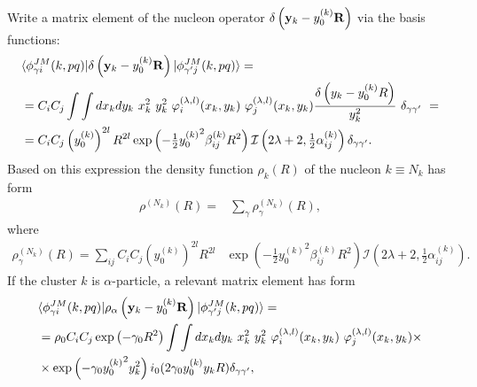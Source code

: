 \documentclass[
12pt, %
oneside, %
english, %
onehalfspacing, %
onehalfspacing, %
headsepline, %
]{MastersDoctoralThesis} %
\begin{document}


Write a matrix element of the nucleon operator $\delta \left( {\bf y}_k-y^{(k)}_0 {\bf R} \right)$ via the basis functions:
\begin{align}
&\langle \phi^{JM}_{\gamma i} (k,pq) \vert 
\delta \left( {\bf y}_k-y^{(k)}_0 {\bf R} \right)
\vert \phi^{JM}_{\gamma' j} (k,pq) \rangle = 
 \label{me_delta_k}\\
& =C_i C_j  \int \int d{ x}_k d{ y}_k ~x_k^{2} ~y^{2}_k
~\varphi^{(\lambda,l)}_i(x_k,y_k) 
~\varphi^{(\lambda,l)}_j (x_k,y_k)
\frac{\delta \left( { y}_k-y^{(k)}_0 { R} \right)}{y_k^2} ~
 \delta_{\gamma \gamma'}~ =
 \nonumber \\
&=
C_iC_j  
\left( y_0^{(k)} \right)^{2l}
R^{2l} 
\exp \left( -\tfrac{1}{2} {y_0^{(k)}}^2 \beta^{(k)}_{ij} R^2 \right)
\mathcal{I}\left( 2\lambda+2, \tfrac{1}{2} \alpha_{ij}^{(k)} \right)  \delta_{\gamma \gamma'}.~
\nonumber
 \end{align}
Based on this expression the density function $\rho_k(R)$ of the nucleon $k \equiv N_k$ has form
\begin{align}
\rho^{(N_k)}(R)=&\sum_{\gamma} \rho^{(N_k)}_\gamma(R),
\label{rho_nk}
\end{align}
where
\begin{align}
\rho^{(N_k)}_\gamma(R)=\sum_{ij} 
C_iC_j  
\left( y_0^{(k)} \right)^{2l}
R^{2l} 
&\exp \left( -\tfrac{1}{2} {y_0^{(k)}}^2 \beta^{(k)}_{ij} R^2 \right)
\mathcal{I}\left( 2\lambda+2, \tfrac{1}{2} \alpha_{ij}^{(k)} \right).
\nonumber
\end{align}
If the cluster $k$ is $\alpha$-particle, a relevant matrix element has form
\begin{align}
&\langle \phi^{JM}_{\gamma i} (k,pq) \vert 
\rho_\alpha \left( {\bf y}_k-y^{(k)}_0 {\bf R} \right)
\vert \phi^{JM}_{\gamma' j} (k,pq) \rangle = 
\label{me_rho_alpha}
\\
\nonumber
& = \rho_0 C_i C_j \exp\left(-\gamma_0 R^2 \right)
 \int \int d{ x}_k d{ y}_k ~x_k^{2} ~y^{2}_k
~\varphi^{(\lambda,l)}_i(x_k,y_k) 
~\varphi^{(\lambda,l)}_j (x_k,y_k) \times \\
& \times \exp \left(-\gamma_0 {y_0^{(k)}}^2 y^2_k \right)
i_0(2\gamma_0 y_0^{(k)} y_k R) \delta_{\gamma \gamma'},
\nonumber
\end{align} 
\end{document}
